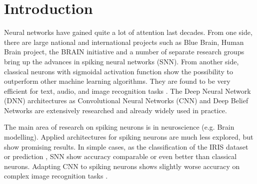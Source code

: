 \documentclass[conference, compsoc]{IEEEtran}
\begin{document}
\section{Introduction}
Neural networks have gained quite a lot of attention last decades. From one side, there are large national and international projects such as Blue Brain, Human Brain project, the BRAIN initiative and a number of separate research groups bring up the advances in spiking neural networks (SNN). From another side, classical neurons with sigmoidal activation function show the possibility to outperform other machine learning algorithms. They are found to be very efficient for text, audio, and image recognition tasks \cite{Overview}. The Deep Neural Network (DNN) architectures as Convolutional Neural Networks (CNN) and Deep Belief Networks are extensively researched and already widely used in practice.

The main area of research on spiking neurons is in neuroscience (e.g. Brain modelling). Applied architectures for spiking neurons are much less explored, but show promising results. In simple cases, as the classification of the IRIS dataset \cite{Johnston2005} or prediction \cite{Johnson2009833}, SNN show accuracy comparable or even better than classical neurons. Adapting CNN to spiking neurons shows slightly worse accuracy on complex image recognition tasks \cite{SNN_DCNN_object_rec,threshold_balancing}.
\end{document}
